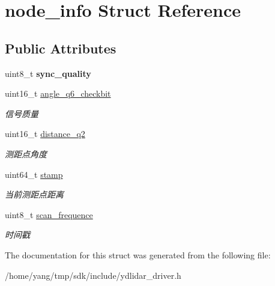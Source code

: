\hypertarget{structnode__info}{}\section{node\+\_\+info Struct Reference}
\label{structnode__info}
\subsection*{Public Attributes}
\begin{DoxyCompactItemize}
\item 
uint8\+\_\+t {\bfseries sync\+\_\+quality}\hypertarget{structnode__info_a45f5ed4efbe416d43171d63c669f02da}{}\label{structnode__info_a45f5ed4efbe416d43171d63c669f02da}

\item 
uint16\+\_\+t \hyperlink{structnode__info_a73e1d282a573f3daa74332fe29b90a26}{angle\+\_\+q6\+\_\+checkbit}\hypertarget{structnode__info_a73e1d282a573f3daa74332fe29b90a26}{}\label{structnode__info_a73e1d282a573f3daa74332fe29b90a26}

\begin{DoxyCompactList}\small\item\em 信号质量 \end{DoxyCompactList}\item 
uint16\+\_\+t \hyperlink{structnode__info_a82eaf27a6196e803d3618c83b052f78c}{distance\+\_\+q2}\hypertarget{structnode__info_a82eaf27a6196e803d3618c83b052f78c}{}\label{structnode__info_a82eaf27a6196e803d3618c83b052f78c}

\begin{DoxyCompactList}\small\item\em 测距点角度 \end{DoxyCompactList}\item 
uint64\+\_\+t \hyperlink{structnode__info_a92f30331da1d7d95f9998dcd3886574c}{stamp}\hypertarget{structnode__info_a92f30331da1d7d95f9998dcd3886574c}{}\label{structnode__info_a92f30331da1d7d95f9998dcd3886574c}

\begin{DoxyCompactList}\small\item\em 当前测距点距离 \end{DoxyCompactList}\item 
uint8\+\_\+t \hyperlink{structnode__info_a718a8a2f94497d5edea2be4550f74348}{scan\+\_\+frequence}\hypertarget{structnode__info_a718a8a2f94497d5edea2be4550f74348}{}\label{structnode__info_a718a8a2f94497d5edea2be4550f74348}

\begin{DoxyCompactList}\small\item\em 时间戳 \end{DoxyCompactList}\end{DoxyCompactItemize}


The documentation for this struct was generated from the following file\+:\begin{DoxyCompactItemize}
\item 
/home/yang/tmp/sdk/include/ydlidar\+\_\+driver.\+h\end{DoxyCompactItemize}
